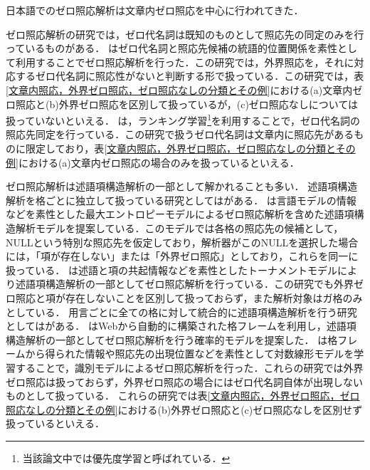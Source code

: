 \documentclass[japanese]{jnlp_1.4}
\begin{document}
日本語でのゼロ照応解析は文章内ゼロ照応を中心に行われてきた．

ゼロ照応解析の研究では，ゼロ代名詞は既知のものとして照応先の同定のみを行っているものがある．
\cite{iida-inui-matsumoto:2006:COLACL}はゼロ代名詞と照応先候補の統語的位置関係を素性として利用することでゼロ照応解析を行った．この研究では，外界照応を，それに対応するゼロ代名詞に照応性がないと判断する形で扱っている．この研究では，表\ref{文章内照応，外界ゼロ照応，ゼロ照応なしの分類とその例}における(a)文章内ゼロ照応と(b)外界ゼロ照応を区別して扱っているが，(c)ゼロ照応なしについては扱っていないといえる．
\cite{磯崎秀樹:2006-07-15}は，ランキング学習\footnote{当該論文中では優先度学習と呼ばれている．}を利用することで，ゼロ代名詞の照応先同定を行っている．この研究で扱うゼロ代名詞は文章内に照応先があるものに限定しており，表\ref{文章内照応，外界ゼロ照応，ゼロ照応なしの分類とその例}における(a)文章内ゼロ照応の場合のみを扱っているといえる．


ゼロ照応解析は述語項構造解析の一部として解かれることも多い．
述語項構造解析を格ごとに独立して扱っている研究としては\cite{imamura-saito-izumi:2009:Short,hayashibe-komachi-matsumoto:2011:IJCNLP-2011}がある．
\cite{imamura-saito-izumi:2009:Short}は言語モデルの情報などを素性とした最大エントロピーモデルによるゼロ照応解析を含めた述語項構造解析モデルを提案している．このモデルでは各格の照応先の候補として，NULLという特別な照応先を仮定しており，解析器がこのNULLを選択した場合には，「項が存在しない」または「外界ゼロ照応」としており，これらを同一に扱っている．
\cite{hayashibe-komachi-matsumoto:2011:IJCNLP-2011}は述語と項の共起情報などを素性としたトーナメントモデルにより述語項構造解析の一部としてゼロ照応解析を行っている．この研究でも外界ゼロ照応と項が存在しないことを区別して扱っておらず，また解析対象はガ格のみとしている．
用言ごとに全ての格に対して統合的に述語項構造解析を行う研究としては\cite{sasano-kawahara-kurohashi:2008:PAPERS,sasano-kurohashi:2011:IJCNLP-2011}がある．
\cite{sasano-kawahara-kurohashi:2008:PAPERS}はWebから自動的に構築された格フレームを利用し，述語項構造解析の一部としてゼロ照応解析を行う確率的モデルを提案した．
\cite{sasano-kurohashi:2011:IJCNLP-2011}は格フレームから得られた情報や照応先の出現位置などを素性として対数線形モデルを学習することで，識別モデルによるゼロ照応解析を行った．これらの研究では外界ゼロ照応は扱っておらず，外界ゼロ照応の場合にはゼロ代名詞自体が出現しないものとして扱っている．
これらの研究では表\ref{文章内照応，外界ゼロ照応，ゼロ照応なしの分類とその例}における(b)外界ゼロ照応と(c)ゼロ照応なしを区別せず扱っているといえる．
\end{document}
